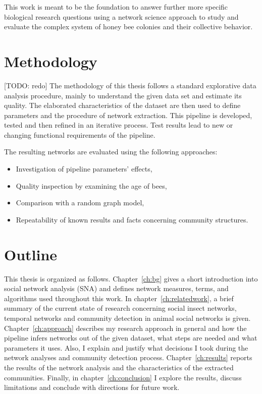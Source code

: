 This work is meant to be the foundation to answer further more specific biological research questions using a network science approach to study and evaluate the complex system of honey bee colonies and their collective behavior.

\section{Methodology}
[TODO: redo]
The methodology of this thesis follows a standard explorative data analysis procedure, mainly to understand the given data set and estimate its quality. The elaborated characteristics of the dataset are then used to define parameters and the procedure of network extraction. This pipeline is developed, tested and then refined in an iterative process. Test results lead to new or changing functional requirements of the pipeline.

The resulting networks are evaluated using the following approaches:

\begin{itemize}
\item Investigation of pipeline parameters' effects,
\item Quality inspection by examining the age of bees,
\item Comparison with a random graph model,
\item Repeatability of known results and facts concerning community structures.
\end{itemize}

\section{Outline}
This thesis is organized as follows. Chapter~\ref{ch:bg} gives a short introduction into social network analysis (SNA) and defines network measures, terms, and algorithms used throughout this work.
In chapter~\ref{ch:relatedwork}, a brief summary of the current state of research concerning social insect networks, temporal networks and community detection in animal social networks is given.
Chapter~\ref{ch:approach} describes my research approach in general and how the pipeline infers networks out of the given dataset, what steps are needed and what parameters it uses.
Also, I explain and justify what decisions I took during the network analyses and community detection process.
Chapter~\ref{ch:results} reports the results of the network analysis and the characteristics of the extracted communities.
Finally, in chapter~\ref{ch:conclusion} I explore the results, discuss limitations and conclude with directions for future work.